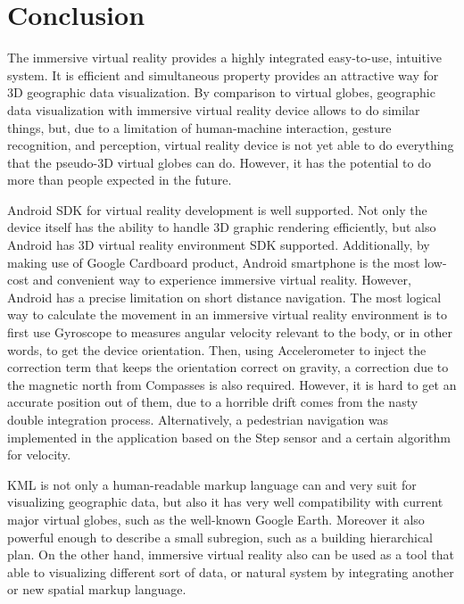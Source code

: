 \chapter{Conclusion}
\label{chapter-conclusion}

The immersive virtual reality provides a highly integrated easy-to-use, intuitive system. It is efficient and simultaneous property provides an attractive way for 3D geographic data visualization. By comparison to virtual globes, geographic data visualization with immersive virtual reality device allows to do similar things, but, due to a limitation of human-machine interaction, gesture recognition, and perception, virtual reality device is not yet able to do everything that the pseudo-3D virtual globes can do. However, it has the potential to do more than people expected in the future.

Android SDK for virtual reality development is well supported. Not only the device itself has the ability to handle 3D graphic rendering efficiently, but also Android has 3D virtual reality environment SDK supported. Additionally, by making use of Google Cardboard product, Android smartphone is the most low-cost and convenient way to experience immersive virtual reality. However, Android has a precise limitation on short distance navigation. The most logical way to calculate the movement in an immersive virtual reality environment is to first use Gyroscope to measures angular velocity relevant to the body, or in other words, to get the device orientation. Then, using Accelerometer to inject the correction term that keeps the orientation correct on gravity, a correction due to the magnetic north from Compasses is also required. However, it is hard to get an accurate position out of them, due to a horrible drift comes from the nasty double integration process. Alternatively, a pedestrian navigation was implemented in the application based on the Step sensor and a certain algorithm for velocity.

KML is not only a human-readable markup language can and very suit for visualizing geographic data, but also it has very well compatibility with current major virtual globes, such as the well-known Google Earth. Moreover it also powerful enough to describe a small subregion, such as a building hierarchical plan. On the other hand, immersive virtual reality also can be used as a tool that able to visualizing different sort of data, or natural system by integrating another or new spatial markup language.

